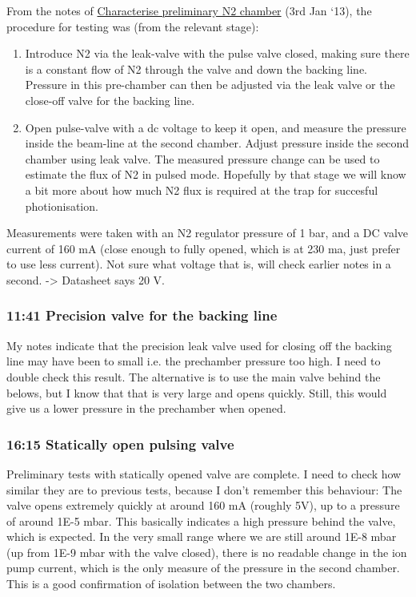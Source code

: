\documentclass[11pt]{article}
\begin{document}
From the notes of \hyperref[id-4c5ea3d0-f615-4635-972b-0d0adbee38df]{Characterise preliminary N2 chamber} (3rd Jan `13),
the procedure for testing was (from the relevant stage):

\begin{enumerate}
\item Introduce N2 via the leak-valve with the pulse valve closed, making
   sure there is a constant flow of N2 through the valve and down the
   backing line. Pressure in this pre-chamber can then be adjusted via
   the leak valve or the close-off valve for the backing line.
\item Open pulse-valve with a dc voltage to keep it open, and measure the
   pressure inside the beam-line at the second chamber. Adjust
   pressure inside the second chamber using leak valve. The measured
   pressure change can be used to estimate the flux of N2 in pulsed
   mode. Hopefully by that stage we will know a bit more about how
   much N2 flux is required at the trap for succesful photionisation.
\end{enumerate}

Measurements were taken with an N2 regulator pressure of 1 bar, and a
DC valve current of 160 mA (close enough to fully opened, which is at
230 ma, just prefer to use less current). Not sure what voltage that
is, will check earlier notes in a second. -> Datasheet says 20 V. 
\subsubsection*{11:41 Precision valve for the backing line}
\label{sec-1-2-3}

My notes indicate that the precision leak valve used for closing off
the backing line may have been to small i.e. the prechamber pressure
too high. I need to double check this result. The alternative is to
use the main valve behind the belows, but I know that that is very
large and opens quickly. Still, this would give us a lower pressure in
the prechamber when opened.
\subsubsection*{16:15 Statically open pulsing valve}
\label{sec-1-2-4}

Preliminary tests with statically opened valve are complete. I need to
check how similar they are to previous tests, because I don't remember
this behaviour: The valve opens extremely quickly at around 160 mA
(roughly 5V), up to a pressure of around 1E-5 mbar. This basically
indicates a high pressure behind the valve, which is expected. In the
very small range where we are still around 1E-8 mbar (up from 1E-9
mbar with the valve closed), there is no readable change in the ion
pump current, which is the only measure of the pressure in the second
chamber. This is a good confirmation of isolation between the two
chambers. 
\end{document}
